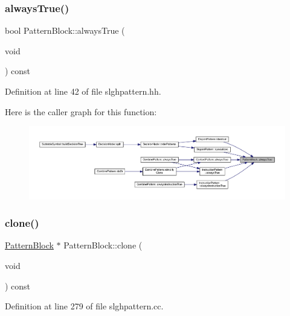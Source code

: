 \subsubsection{\texorpdfstring{alwaysTrue()}{alwaysTrue()}}
{\footnotesize\ttfamily bool Pattern\+Block\+::always\+True (\begin{DoxyParamCaption}\item[{void}]{ }\end{DoxyParamCaption}) const\hspace{0.3cm}{\ttfamily [inline]}}



Definition at line 42 of file slghpattern.\+hh.

Here is the caller graph for this function\+:
\nopagebreak
\begin{figure}[H]
\begin{center}
\leavevmode
\includegraphics[width=350pt]{class_pattern_block_aa891af56e7ea4582f0afb6d32efead2b_icgraph}
\end{center}
\end{figure}
\mbox{\label{class_pattern_block_a75532185fe8a7faafba4e12ba20438b2}} 
\subsubsection{\texorpdfstring{clone()}{clone()}}
{\footnotesize\ttfamily \mbox{\hyperlink{class_pattern_block}{Pattern\+Block}} $\ast$ Pattern\+Block\+::clone (\begin{DoxyParamCaption}\item[{void}]{ }\end{DoxyParamCaption}) const}



Definition at line 279 of file slghpattern.\+cc.

